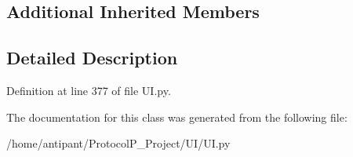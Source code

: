 \subsection*{Additional Inherited Members}


\subsection{Detailed Description}


Definition at line 377 of file U\-I.\-py.



The documentation for this class was generated from the following file\-:\begin{DoxyCompactItemize}
\item 
/home/antipant/\-Protocol\-P\-\_\-\-Project/\-U\-I/U\-I.\-py\end{DoxyCompactItemize}
